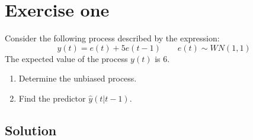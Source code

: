 \section{Exercise one}

Consider the following process described by the expression:
\[y(t)=e(t)+5e(t-1)\qquad e(t)\sim WN(1,1)\]
The expected value of the process $y(t)$ is 6. 
\begin{enumerate}
    \item Determine the unbiased process.
    \item Find the predictor $\hat{y}(t|t-1)$. 
\end{enumerate}

\subsection*{Solution}
